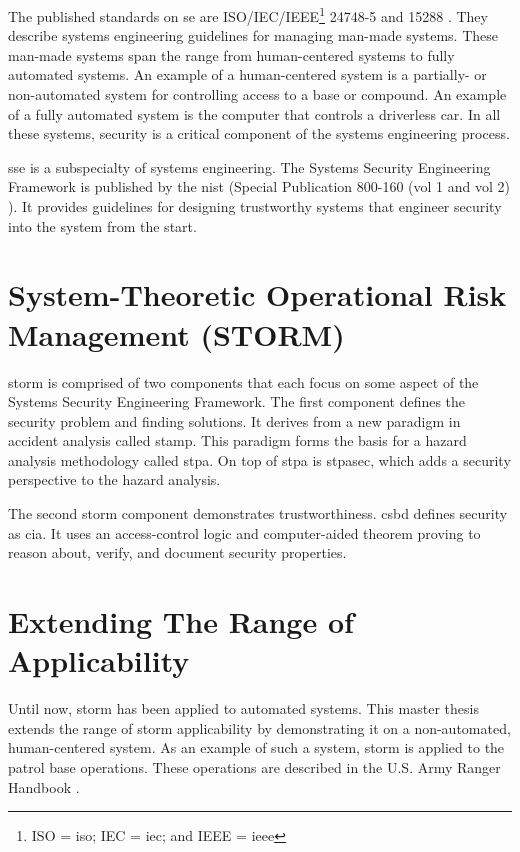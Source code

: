 \documentclass[../../main/main.tex]{subfiles}
\begin{document}
The published standards on \gls{se} are ISO/IEC/IEEE\footnote{ISO = \gls{iso}; IEC = \gls{iec}; and IEEE = \gls{ieee}} 24748-5  and \cite{iso247482017} 15288 \cite{iso15288}.  They describe systems engineering guidelines for managing man-made systems.  These man-made systems span the range from human-centered systems to fully automated systems.  An example of a human-centered system is a partially- or non-automated system for controlling access to a base or compound.  An example of a fully automated system is the computer that controls a driverless car.  In all these systems, security is a critical component of the systems engineering process.


\Gls{sse} is a subspecialty of systems engineering.  The Systems Security Engineering Framework is published by the \gls{nist} (Special Publication 800-160 (vol 1 and vol 2) \cite{NIST800160}).  It provides guidelines for designing trustworthy systems that engineer security into the system from the start.  

\section{System-Theoretic Operational Risk Management (STORM)}\label{sec:intro:storm}
\Gls{storm} is comprised of two components that each focus on some aspect of the Systems Security Engineering Framework.  The first component defines the security problem and finding solutions. It derives from a new paradigm in accident analysis called \Gls{stamp}.  This paradigm forms the basis for a hazard analysis methodology called \Gls{stpa}.  On top of \gls{stpa} is \Gls{stpasec}, which adds a security perspective to the hazard analysis. 

The second \gls{storm} component demonstrates trustworthiness.  \Gls{csbd} defines security as \gls{cia}.  It uses an access-control logic and computer-aided theorem proving to reason about, verify, and document security properties.

\section{Extending The Range of Applicability}\label{sec:intro:motivation}
Until now, \gls{storm} has been applied to automated systems.  This master thesis extends the range of \gls{storm} applicability by demonstrating it on a non-automated, human-centered system.  As an example of such a system, \gls{storm} is applied to the patrol base operations.  These operations are described in the U.S. Army Ranger Handbook \cite{rangermanual}.   
\end{document}
